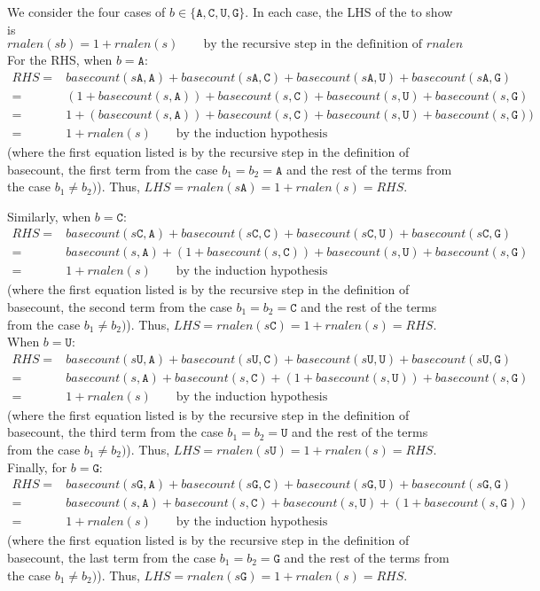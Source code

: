 \documentclass[12pt, oneside]{article}
\newcommand{\A}[0]{\texttt{A}}
\newcommand{\C}[0]{\texttt{C}}
\newcommand{\G}[0]{\texttt{G}}
\newcommand{\U}[0]{\texttt{U}}
\begin{document}
\begin{description}
\begin{enumerate}
{\begin{itemize}
  We consider the four cases of $b \in \{ \A, \C, \U, \G \}$. In each case, the LHS of the to show is
  \[
  rnalen(sb) = 1 + rnalen(s) \qquad\text{by the recursive step in the  definition of $rnalen$}
  \]
  For the RHS, when $b = \A$:
  \begin{align*}
  RHS = &basecount(s\A,\A) + basecount(s\A,\C) + basecount(s\A,\U) + basecount(s\A,\G) \\
  = &(1 + basecount(s,\A)) + basecount(s,\C) +basecount(s,\U) + basecount(s,\G) \\
  = &1 + ( basecount(s,\A)) + basecount(s,\C) +basecount(s,\U) + basecount(s,\G) ) \\
  = &1 + rnalen(s)  \qquad \text{by the induction hypothesis}
  \end{align*}
  (where the first equation listed is by the recursive step in the definition of basecount, the first term 
  from the case $b_1 = b_2 = \A$  and the rest of the terms from the case $b_1 \neq b_2)$).
  Thus, 
  $LHS = rnalen(s\A)  = 1+ rnalen(s) = RHS$.
  
  Similarly, when $b = \C$:
  \begin{align*}
  RHS = &basecount(s\C,\A) + basecount(s\C,\C) + basecount(s\C,\U) + basecount(s\C,\G) \\
  = &basecount(s,\A) + ( 1+ basecount(s,\C) ) +basecount(s,\U) + basecount(s,\G) \\
  = &1 + rnalen(s)  \qquad \text{by the induction hypothesis}
  \end{align*}
  (where the first equation listed is by the recursive step in the definition of basecount, the second term 
  from the case $b_1 = b_2 = \C$  and the rest of the terms from the case $b_1 \neq b_2)$).
  Thus, 
  $LHS = rnalen(s\C)  = 1+ rnalen(s) = RHS$. When $b = \U$:
  \begin{align*}
  RHS = &basecount(s\U,\A) + basecount(s\U,\C) + basecount(s\U,\U) + basecount(s\U,\G) \\
  = &basecount(s,\A) + basecount(s,\C) + ( 1 + basecount(s,\U)) + basecount(s,\G) \\
  = &1 + rnalen(s)  \qquad \text{by the induction hypothesis}
  \end{align*}
  (where the first equation listed is by the recursive step in the definition of basecount, the third term 
  from the case $b_1 = b_2 = \U$  and the rest of the terms from the case $b_1 \neq b_2)$).
  Thus, 
  $LHS = rnalen(s\U)  = 1+ rnalen(s) = RHS$. Finally, for $b = \G$:
  \begin{align*}
  RHS = &basecount(s\G,\A) + basecount(s\G,\C) + basecount(s\G,\U) + basecount(s\G,\G) \\
  = &basecount(s,\A) + basecount(s,\C)  + basecount(s,\U) + ( 1+ basecount(s,\G) )\\
  = &1 + rnalen(s)  \qquad \text{by the induction hypothesis}
  \end{align*}
  (where the first equation listed is by the recursive step in the definition of basecount, the last term 
  from the case $b_1 = b_2 = \G$  and the rest of the terms from the case $b_1 \neq b_2)$).
  Thus, 
  $LHS = rnalen(s\G)  = 1+ rnalen(s) = RHS$.
  

\end{itemize}}
\end{enumerate}
\end{description}
\end{document}
